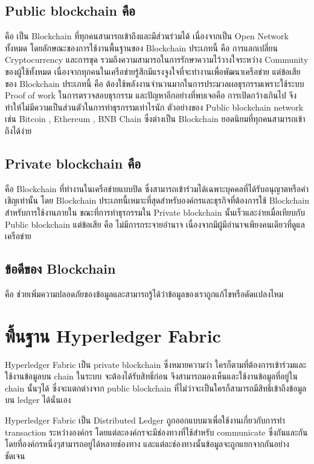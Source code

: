 \subsection{Public blockchain คือ}
คือ เป็น Blockchain ที่ทุกคนสามารถเข้าถึงและมีส่วนร่วมได้ เนื่องจากเป็น Open Network ทั้งหมด โดยลักษณะของการใช้งานพื้นฐานของ Blockchain ประเภทนี้ คือ การแลกเปลี่ยน Cryptocurrency และการขุด รวมถึงความสามารถในการรักษาความไว้วางใจระหว่าง Community ของผู้ใช้ทั้งหมด 
เนื่องจากทุกคนในเครือข่ายรู้สึกมีแรงจูงใจที่จะทำงานเพื่อพัฒนาเครือข่าย แต่ข้อเสียของ Blockchain ประเภทนี้ คือ ต้องใช้พลังงานจำนวนมากในการประมวลผลธุรกรรมเพราะใช้ระบบ Proof of work ในการตรวจสอบธุรกรรม และปัญหาอีกอย่างที่พบเจอคือ การเปิดกว้างเกินไป จึงทำให้ไม่มีความเป็นส่วนตัวในการทำธุรกรรมเท่าไรนัก
ตัวอย่างของ Public blockchain network เช่น Bitcoin  , Ethereum , BNB Chain ซึ่งต่างเป็น Blockchain ยอดนิยมที่ทุกคนสามารถเข้าถึงได้ง่าย
\subsection{Private blockchain คือ}
คือ Blockchain ที่ทำงานในเครือข่ายแบบปิด ซึ่งสามารถเข้าร่วมได้เฉพาะบุคคลที่ได้รับอนุญาตหรือคำเชิญเท่านั้น โดย Blockchain ประเภทนี้เหมาะที่สุดสำหรับองค์กรและธุรกิจที่ต้องการใช้ Blockchain สำหรับการใช้งานภายใน 
ขณะที่การทำธุรกรรมใน Private blockchain นั้นเร็วและง่ายเมื่อเทียบกับ Public blockchain แต่ข้อเสีย คือ ไม่มีการกระจายอำนาจ เนื่องจากมีผู้มีอำนาจเพียงคนเดียวที่ดูแลเครือข่าย
\subsection{ข้อดีของ Blockchain}
คือ ช่วยเพิ่มความปลอดภัยของข้อมูลและสามารถรู้ได้ว่าข้อมูลของเราถูกแก้ไขหรือดัดแปลงไหม

\section{พื้นฐาน Hyperledger Fabric}
\enskip \enskip \enskip \enskip \enskip Hyperledger Fabric เป็น private blockchain ซึ่งหมายความว่า ใครก็ตามที่ต้องการเข้าร่วมและใช้งานข้อมูลบน chain ในระบบ จะต้องได้รับสิทธิ์ก่อน จึงสามารถมองเห็นและใช้งานข้อมูลที่อยู่ใน chain นั้นๆได้ ซึ่งจะแตกต่างจาก public blockchain ที่ไม่ว่าจะเป็นใครก็สามารถมีสิทธิ์เข้าถึงข้อมูลบน ledger ได้นั่นเอง

Hyperledger Fabric เป็น Distributed Ledger ถูกออกแบบมาเพื่อใช้งานเกี่ยวกับการทำ transaction ระหว่างองค์กร โดยแต่ละองค์กรจะมีช่องทางที่ใช้สำหรับ communicate ซึ่งกันและกัน โดยที่องค์กรหนึ่งๆสามารถอยู่ได้หลายช่องทาง และแต่ละช่องทางนั้นข้อมูลจะถูกแยกจากกันอย่างชัดเจน


